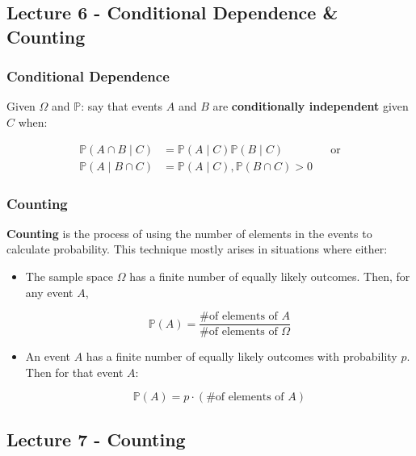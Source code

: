 \documentclass{article}
\begin{document}
\subsection{Lecture 6 - Conditional Dependence \& Counting}

\subsubsection{Conditional Dependence}

Given $\Omega$ and $\mathbb{P}$: say that events $A$ and $B$ are
\textbf{conditionally independent} given $C$ when:

\begin{equation}
  \tag{Conditional Independence Def}
  \boxed{
    \begin{aligned}
      \mathbb{P}(A \cap B \mid C)
      &= \mathbb{P}(A \mid C) \mathbb{P}(B \mid C)
      && \text{or} \\
      \mathbb{P}(A \mid B \cap C)
      &= \mathbb{P}(A \mid C), \mathbb{P}(B \cap C) > 0
    \end{aligned}
  }
\end{equation}

\subsubsection{Counting}

\textbf{Counting} is the process of using the number of elements in
the events to calculate probability. This technique mostly arises in
situations where either:

\begin{itemize}
\item The sample space $\Omega$ has a finite number of equally likely
  outcomes. Then, for any event $A$,

  \[
    \mathbb{P}(A) = \frac{\text{\# of elements of } A}
    {\text{\# of elements of } \Omega}
  \]

\item An event $A$ has a finite number of equally likely outcomes with
  probability $p$. Then for that event $A$:

  \[
    \mathbb{P}(A) = p \cdot (\text{\# of elements of }A)
  \]
\end{itemize}


\subsection{Lecture 7 - Counting}
\end{document}

